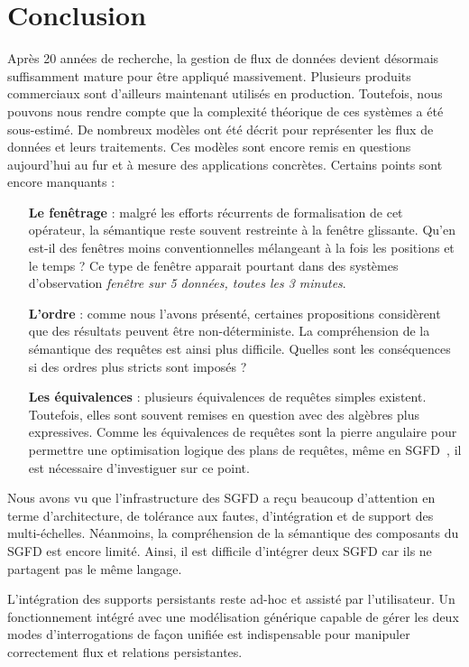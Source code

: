 \section{Conclusion}
Après 20 années de recherche, la gestion de flux de données devient désormais suffisamment mature pour être appliqué massivement. Plusieurs produits commerciaux sont d'ailleurs maintenant utilisés en production. Toutefois, nous pouvons nous rendre compte que la complexité théorique de ces systèmes a été sous-estimé. De nombreux modèles ont été décrit pour représenter les flux de données et leurs traitements. Ces modèles sont encore remis en questions aujourd'hui au fur et à mesure des applications concrètes. Certains points sont encore manquants :
\begin{itemize}
\item[\textbf{Le fenêtrage}] : malgré les efforts récurrents de formalisation de cet opérateur, la sémantique reste souvent restreinte à la fenêtre glissante. Qu'en est-il des fenêtres moins conventionnelles mélangeant à la fois les positions et le temps ? Ce type de fenêtre apparait pourtant dans des systèmes d'observation \textit{fenêtre sur 5 données, toutes les 3 minutes}.
\item[\textbf{L'ordre}] : comme nous l'avons présenté, certaines propositions considèrent que des résultats peuvent être non-déterministe. La compréhension de la sémantique des requêtes est ainsi plus difficile. Quelles sont les conséquences si des ordres plus stricts sont imposés ?
\item[\textbf{Les équivalences}] : plusieurs équivalences de requêtes simples existent. Toutefois, elles sont souvent remises en question avec des algèbres plus expressives. Comme les équivalences de requêtes sont la pierre angulaire pour permettre une optimisation logique des plans de requêtes, même en SGFD~\cite{Slivinskas:temporal,Arasu:stream}, il est nécessaire d'investiguer sur ce point.
\end{itemize}

Nous avons vu que l'infrastructure des SGFD a reçu beaucoup d'attention en terme d'architecture, de tolérance aux fautes, d'intégration et de support des multi-échelles. Néanmoins, la compréhension de la sémantique des composants du SGFD est encore limité. Ainsi, il est difficile d'intégrer deux SGFD car ils ne partagent pas le même langage.

L'intégration des supports persistants reste ad-hoc et assisté par l'utilisateur. Un fonctionnement intégré avec une modélisation générique capable de gérer les deux modes d'interrogations de façon unifiée est indispensable pour manipuler correctement flux et relations persistantes.

